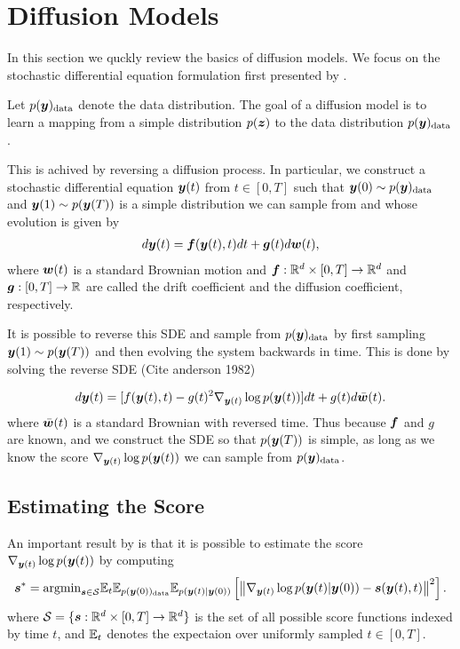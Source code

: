 \section{Diffusion Models}
In this section we quckly review the basics of diffusion models.
We focus on the stochastic differential equation formulation
first presented by \citet{song2021scorebased}.

Let $p(\boldsymbol{y})_\text{data}$ denote the data distribution.
The goal of a diffusion model is to learn a mapping from a
simple distribution $p(\boldsymbol{z})$ to the data distribution $p(\boldsymbol{y})_\text{data}$.

This is achived by reversing a diffusion process.
In particular, we construct a stochastic differential equation $\boldsymbol{y}(t)$ from
$t \in [0, T]$
such that $\boldsymbol{y}(0) \sim p(\boldsymbol{y})_\text{data}$ and $\boldsymbol{y}(1) \sim p(\boldsymbol{y}(T))$
is a simple distribution we can sample from and whose evolution is given by
\begin{align}
  d \boldsymbol{y}(t) = \boldsymbol{f}(\boldsymbol{y}(t), t) dt + \boldsymbol{g}(t) d\boldsymbol{w}(t),
\end{align}
where $\boldsymbol{w}(t)$ is a standard Brownian motion and $\boldsymbol{f} : \mathbb{R}^d \times [0, T] \to \mathbb{R}^d$
and $\boldsymbol{g} : [0, T] \to \mathbb{R}$ are called the drift coefficient and the diffusion coefficient, respectively.

It is possible to reverse this SDE and sample from $p(\boldsymbol{y})_\text{data}$ by first sampling
$\boldsymbol{y}(1) \sim p(\boldsymbol{y}(T))$ and then evolving the system backwards in time. This is done by solving the
reverse SDE (Cite anderson 1982)

\begin{align}
    d \boldsymbol{y}(t) = [f(\boldsymbol{y}(t), t) - g(t)^2 \nabla_{\boldsymbol{y}(t)} \log p(\boldsymbol{y}(t))] dt + g(t) d\bar{\boldsymbol{w}}(t).
  \end{align}
where $\bar{\boldsymbol{w}}(t)$ is a standard Brownian with reversed time. Thus because $\boldsymbol{f}$ and $g$ are known,
and we construct the SDE so that $p(\boldsymbol{y}(T))$ is simple, as long
as we know the score $\nabla_{\boldsymbol{y}(t)} \log p(\boldsymbol{y}(t))$ we can sample from $p(\boldsymbol{y})_\text{data}$.

\subsection*{Estimating the Score}
An important result by \citet{Vincent2010} is that it is possible to estimate the score
$\nabla_{\boldsymbol{y}(t)} \log p(\boldsymbol{y}(t))$ by computing
\begin{align}
    \boldsymbol{s}^* = \text{argmin}_{\boldsymbol{s} \in \mathcal{S}}  \mathbb{E}_{t}\mathbb{E}_{p(\boldsymbol{y}(0))_\text{data}}\mathbb{E}_{p(\boldsymbol{y}(t)|\boldsymbol{y}(0))} \left[ \left\| \nabla_{\boldsymbol{y}(t)} \log p(\boldsymbol{y}(t)| \boldsymbol{y}(0)) - \boldsymbol{s}(\boldsymbol{y}(t), t) \right\|^2 \right].
\end{align}
where $\mathcal{S} = \{ \boldsymbol{s}: \mathbb{R}^d \times [0, T] \to \mathbb{R}^d \}$ is the set of all possible score functions
indexed by time $t$, and $\mathbb{E}_{t}$ denotes the expectaion over uniformly sampled $t \in [0, T]$.


